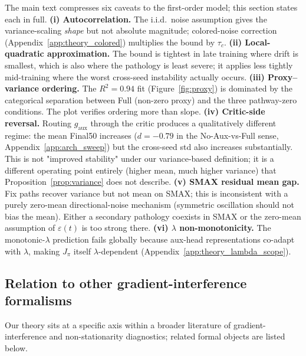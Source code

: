 \documentclass{article}
\theoremstyle{plain}
\theoremstyle{definition}
\theoremstyle{remark}
\begin{document}
The main text compresses six caveats to the first-order model;
this section states each in full.
\textbf{(i) Autocorrelation.} The i.i.d.\ noise assumption gives
the variance-scaling \emph{shape} but not absolute magnitude;
colored-noise correction (Appendix~\ref{app:theory_colored})
multiplies the bound by $\tau_c$.
\textbf{(ii) Local-quadratic approximation.} The bound is tightest
in late training where drift is smallest, which is also where the
pathology is least severe; it applies less tightly mid-training
where the worst cross-seed instability actually occurs.
\textbf{(iii) Proxy--variance ordering.} The $R^2 = 0.94$ fit
(Figure~\ref{fig:proxy}) is dominated by the categorical separation
between Full (non-zero proxy) and the three pathway-zero
conditions. The plot verifies ordering more than slope.
\textbf{(iv) Critic-side reversal.} Routing $g_{\mathrm{aux}}$
through the critic produces a qualitatively different regime: the
mean Final50 increases ($d = -0.79$ in the No-Aux-vs-Full sense,
Appendix~\ref{app:arch_sweep}) but the cross-seed std also
increases substantially. This is not "improved stability" under
our variance-based definition; it is a different operating point
entirely (higher mean, much higher variance) that
Proposition~\ref{prop:variance} does not describe.
\textbf{(v) SMAX residual mean gap.} Fix paths recover variance
but not mean on SMAX; this is inconsistent with a purely zero-mean
directional-noise mechanism (symmetric oscillation should not bias
the mean). Either a secondary pathology coexists in SMAX or the
zero-mean assumption of $\varepsilon(t)$ is too strong there.
\textbf{(vi) $\lambda$ non-monotonicity.} The monotonic-$\lambda$
prediction fails globally because aux-head representations co-adapt
with $\lambda$, making $J_\pi$ itself $\lambda$-dependent
(Appendix~\ref{app:theory_lambda_scope}).

\subsection{Relation to other gradient-interference formalisms}
\label{app:theory_related_formalisms}

Our theory sits at a specific axis within a broader literature of
gradient-interference and non-stationarity diagnostics; related
formal objects are listed below.
\end{document}
